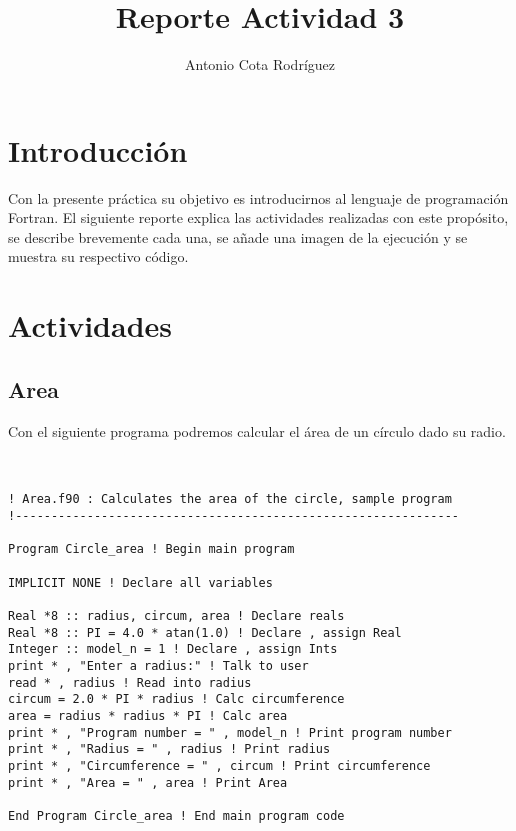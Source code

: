 \documentclass{article}
\title{Reporte Actividad 3}
\author{Antonio Cota Rodr\'iguez}
\date{}
\begin{document}
\maketitle

\graphicspath{ {Imagenes/} }


\section*{Introducci\'on}

Con la presente pr\'actica su objetivo es introducirnos al lenguaje de programaci\'on Fortran. El siguiente reporte explica las actividades realizadas con este prop\'osito, se describe brevemente cada una, se a\~nade una imagen de la ejecuci\'on y se muestra su respectivo c\'odigo.
\section*{Actividades}

\subsection*{Area}
Con el siguiente programa podremos calcular el \'area de un c\'irculo dado su radio.\\ \\
	
\begin{Verbatim}[frame=single]

! Area.f90 : Calculates the area of the circle, sample program
!--------------------------------------------------------------

Program Circle_area ! Begin main program

IMPLICIT NONE ! Declare all variables

Real *8 :: radius, circum, area ! Declare reals
Real *8 :: PI = 4.0 * atan(1.0) ! Declare , assign Real
Integer :: model_n = 1 ! Declare , assign Ints
print * , "Enter a radius:" ! Talk to user
read * , radius ! Read into radius
circum = 2.0 * PI * radius ! Calc circumference 
area = radius * radius * PI ! Calc area 
print * , "Program number = " , model_n ! Print program number
print * , "Radius = " , radius ! Print radius
print * , "Circumference = " , circum ! Print circumference
print * , "Area = " , area ! Print Area

End Program Circle_area ! End main program code


\end{Verbatim}
\end{document}
